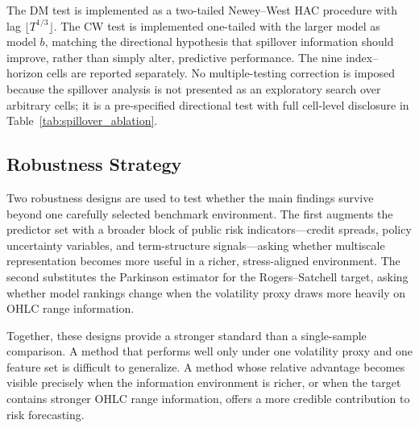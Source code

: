 The DM test is implemented as a two-tailed Newey--West HAC procedure with lag \(\lfloor T^{1/3}\rfloor\). The CW test is implemented one-tailed with the larger model as model \(b\), matching the directional hypothesis that spillover information should improve, rather than simply alter, predictive performance. The nine index--horizon cells are reported separately. No multiple-testing correction is imposed because the spillover analysis is not presented as an exploratory search over arbitrary cells; it is a pre-specified directional test with full cell-level disclosure in Table~\ref{tab:spillover_ablation}.

\subsection{Robustness Strategy}

Two robustness designs are used to test whether the main findings survive beyond one carefully selected benchmark environment. The first augments the predictor set with a broader block of public risk indicators---credit spreads, policy uncertainty variables, and term-structure signals---asking whether multiscale representation becomes more useful in a richer, stress-aligned environment. The second substitutes the Parkinson estimator for the Rogers--Satchell target, asking whether model rankings change when the volatility proxy draws more heavily on OHLC range information.

Together, these designs provide a stronger standard than a single-sample comparison. A method that performs well only under one volatility proxy and one feature set is difficult to generalize. A method whose relative advantage becomes visible precisely when the information environment is richer, or when the target contains stronger OHLC range information, offers a more credible contribution to risk forecasting.

